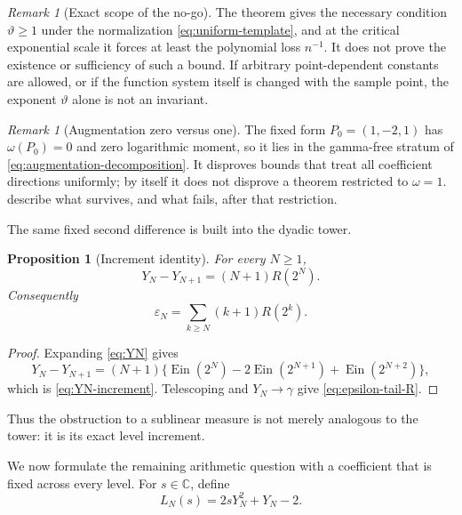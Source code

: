 \documentclass[11pt]{article}
\newtheorem{proposition}[theorem]{Proposition}
\theoremstyle{definition}
\theoremstyle{remark}
\newtheorem{remark}[theorem]{Remark}
\newcommand{\C}{\mathbb C}
\newcommand{\Ein}{\operatorname{Ein}}
\begin{document}
\begin{remark}[Exact scope of the no-go]
The theorem gives the necessary condition \(\vartheta\ge1\) under the
normalization \eqref{eq:uniform-template}, and at the critical exponential
scale it forces at least the polynomial loss \(n^{-1}\).  It does not prove
the existence or sufficiency of such a bound.  If arbitrary point-dependent
constants are allowed, or if the function system itself is changed with the
sample point, the exponent \(\vartheta\) alone is not an invariant.
\end{remark}

\begin{remark}[Augmentation zero versus one]
The fixed form \(P_0=(1,-2,1)\) has \(\omega(P_0)=0\) and zero logarithmic
moment, so it lies in the gamma-free stratum of
\eqref{eq:augmentation-decomposition}.  It disproves bounds that treat all
coefficient directions uniformly; by itself it does not disprove a theorem
restricted to \(\omega=1\).
describe what survives, and what fails, after that restriction.
\end{remark}

The same fixed second difference is built into the dyadic tower.

\begin{proposition}[Increment identity]
\label{prop:increment-identity}
For every \(N\ge1\),
\begin{equation}\label{eq:YN-increment}
 \boxed{\displaystyle
 Y_N-Y_{N+1}=(N+1)R(2^N).}
\end{equation}
Consequently
\begin{equation}\label{eq:epsilon-tail-R}
 \varepsilon_N=\sum_{k\ge N}(k+1)R(2^k).
\end{equation}
\end{proposition}

\begin{proof}
Expanding \eqref{eq:YN} gives
\[
 Y_N-Y_{N+1}
 =(N+1)\{\Ein(2^N)-2\Ein(2^{N+1})+\Ein(2^{N+2})\},
\]
which is \eqref{eq:YN-increment}.  Telescoping and
\(Y_N\to\gamma\) give \eqref{eq:epsilon-tail-R}.
\end{proof}

Thus the obstruction to a sublinear measure is not merely analogous to the
tower: it is its exact level increment.

We now formulate the remaining arithmetic question with a coefficient that
is fixed across every level.  For \(s\in\C\), define
\begin{equation}\label{eq:LN-def}
 L_N(s)=2sY_N^2+Y_N-2.
\end{equation}
\end{document}
